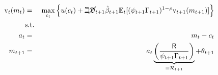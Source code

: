 \begin{eqnarray*}
    {\ensuremath{\mathrm{v}}}_{t}({m}_{t}) & = & \max_{{c}_{t}} \left\{u({c}_{t})+\beth\cancel{\mathfrak{D}}_{t+1}\hat{\beta}_{t+1}
    \mathbb{E}_{t}[(\psi_{t+1}\Gamma_{t+1})^{1-\rho}{\mathrm{v}}_{t+1}({m}_{t+1})] \right\}   \\
         & \text{s.t.} &   \nonumber \\
    {a}_{t}   & = & {m}_{t}-{c}_{t} \nonumber
\\      {m}_{t+1} & = & {a}_{t}\underbrace{\left(\frac{\mathsf{R}}{\psi_{t+1}\Gamma_{t+1}}\right)}_{\equiv \mathcal{R}_{t+1}}+\theta_{t+1}
\end{eqnarray*}
